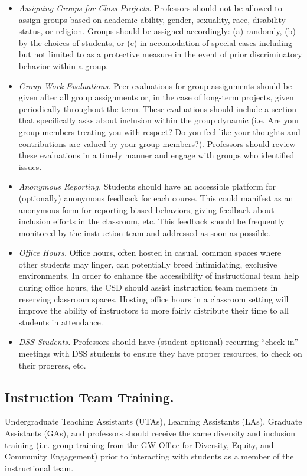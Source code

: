 \documentclass{article}
\begin{document}
\begin{itemize}
\begin{center}
{}
\end{center}
\item
\emph{Assigning Groups for Class Projects.} 
Professors should not be allowed to assign groups based on academic ability, gender, sexuality, race, disability
status, or religion.
Groups should be assigned accordingly: (a) randomly, (b) by the choices of students, or (c) in accomodation of special 
cases including but not limited to as a protective measure in the event of prior discriminatory behavior within a group.
\item
\emph{Group Work Evaluations.} Peer evaluations for group assignments should be given after all group assignments 
or, in the case of long-term projects, given periodically throughout the term. These evaluations should include a 
section that specifically asks about inclusion within the group dynamic (i.e. Are your group members treating 
you with respect? Do you feel like your thoughts and contributions are valued by your group members?). Professors 
should review these evaluations in a timely manner and engage with groups who identified issues. 
\item
\emph{Anonymous Reporting.} 
Students should have an accessible platform for (optionally) anonymous feedback for each course. 
This could manifest as an anonymous form for reporting biased behaviors, giving feedback about inclusion efforts 
in the classroom, etc. This feedback should be frequently monitored by the instruction team and addressed as soon 
as possible. 
\item 
\emph{Office Hours.} 
Office hours, often hosted in casual, common spaces where other students may linger, 
can potentially breed intimidating, exclusive environments. In order to enhance the accessibility of 
instructional team help during office hours, the CSD should assist instruction team members in reserving 
classroom spaces. Hosting office hours in a classroom setting will improve the ability of instructors to more 
fairly distribute their time to all students in attendance. 

\item
\emph{DSS Students.} 
Professors should have (student-optional) recurring “check-in” meetings with DSS students to 
ensure they have proper resources, to check on their progress, etc.
\end{itemize}

\subsection{Instruction Team Training.} 
Undergraduate Teaching Assistants (UTAs), Learning Assistants (LAs), Graduate Assistants (GAs), and 
professors should receive the same diversity and inclusion training (i.e. group training from the GW Office 
for Diversity, Equity, and Community Engagement) prior to interacting with students as a member of the 
instructional team. 
\end{document}
